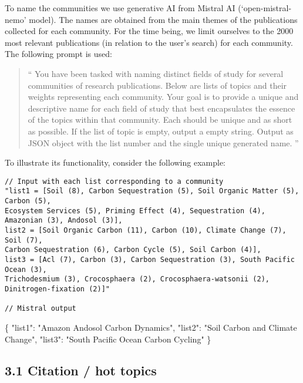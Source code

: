 \documentclass[
]{article}
\newenvironment{Shaded}{}{}
\newcommand{\DataTypeTok}[1]{\textcolor[rgb]{0.56,0.13,0.00}{#1}}
\newcommand{\FunctionTok}[1]{\textcolor[rgb]{0.02,0.16,0.49}{#1}}
\newcommand{\StringTok}[1]{\textcolor[rgb]{0.25,0.44,0.63}{#1}}
\begin{document}
To name the communities we use generative AI from Mistral AI
(`open-mistral-nemo' model). The names are obtained from the main themes
of the publications collected for each community. For the time being, we
limit ourselves to the 2000 most relevant publications (in relation to
the user's search) for each community. The following prompt is used:

\begin{quote}
`` You have been tasked with naming distinct fields of study for several
communities of research publications. Below are lists of topics and
their weights representing each community. Your goal is to provide a
unique and descriptive name for each field of study that best
encapsulates the essence of the topics within that community. Each
should be unique and as short as possible. If the list of topic is
empty, output a empty string. Output as JSON object with the list number
and the single unique generated name. ''
\end{quote}

To illustrate its functionality, consider the following example:

\begin{verbatim}
// Input with each list corresponding to a community
"list1 = [Soil (8), Carbon Sequestration (5), Soil Organic Matter (5), Carbon (5),  
Ecosystem Services (5), Priming Effect (4), Sequestration (4), Amazonian (3), Andosol (3)],  
list2 = [Soil Organic Carbon (11), Carbon (10), Climate Change (7), Soil (7),  
Carbon Sequestration (6), Carbon Cycle (5), Soil Carbon (4)],  
list3 = [Acl (7), Carbon (3), Carbon Sequestration (3), South Pacific Ocean (3),  
Trichodesmium (3), Crocosphaera (2), Crocosphaera-watsonii (2), Dinitrogen-fixation (2)]"

// Mistral output
\end{verbatim}

\begin{Shaded}
\begin{Highlighting}[]
\FunctionTok{\{}
  \DataTypeTok{"list1"}\FunctionTok{:} \StringTok{"Amazon Andosol Carbon Dynamics"}\FunctionTok{,}
  \DataTypeTok{"list2"}\FunctionTok{:} \StringTok{"Soil Carbon and Climate Change"}\FunctionTok{,}
  \DataTypeTok{"list3"}\FunctionTok{:} \StringTok{"South Pacific Ocean Carbon Cycling"}
\FunctionTok{\}}
\end{Highlighting}
\end{Shaded}

\hypertarget{citation-hot-topics}{%
\subsection{3.1 Citation / hot topics}\label{citation-hot-topics}}
\end{document}
